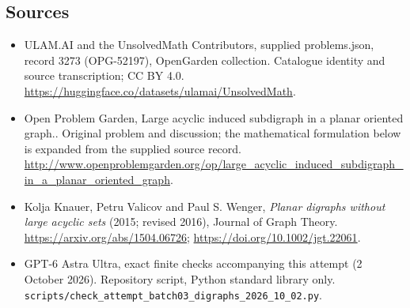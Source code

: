 \documentclass[11pt,a4paper]{article}
\begin{document}
\subsection{Sources}
\begin{itemize}
\item[S1] ULAM.AI and the UnsolvedMath Contributors, supplied problems.json, record 3273 (OPG-52197), OpenGarden collection. Catalogue identity and source transcription; CC BY 4.0.
\url{https://huggingface.co/datasets/ulamai/UnsolvedMath}.
\item[S2] Open Problem Garden, Large acyclic induced subdigraph in a planar oriented graph.. Original problem and discussion; the mathematical formulation below is expanded from the supplied source record.
\url{http://www.openproblemgarden.org/op/large_acyclic_induced_subdigraph_in_a_planar_oriented_graph}.
\item[S3] Kolja Knauer, Petru Valicov and Paul S. Wenger, \emph{Planar digraphs without large acyclic sets} (2015; revised 2016), Journal of Graph Theory. \url{https://arxiv.org/abs/1504.06726}; \url{https://doi.org/10.1002/jgt.22061}.
\item[S9] GPT-6 Astra Ultra, exact finite checks accompanying this attempt (2 October 2026). Repository script, Python standard library only. \texttt{scripts/check\_attempt\_batch03\_digraphs\_2026\_10\_02.py}.
\end{itemize}
\end{document}
